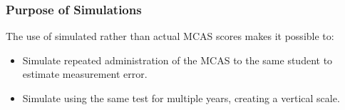 \documentclass{beamer}
\begin{document}
\begin{frame}
\frametitle{Purpose of Simulations}
The use of simulated rather than actual MCAS scores makes it possible to:
\par\vspace{0.5 cm}
\begin{itemize}  
\item  Simulate repeated administration of the MCAS to the same student to estimate measurement error.
\item  Simulate using the same test for multiple years, creating a vertical scale.
\end{itemize}
\end{frame}
\end{document}
